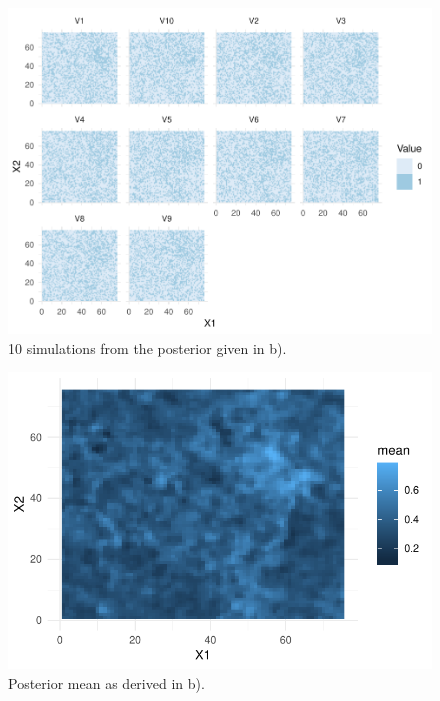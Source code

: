 \begin{figure}
    \centering
    \includegraphics{figures/b_sims.pdf}
    \caption{10 simulations from the posterior given in b).}
    \label{fig:b_sims}
\end{figure}

\begin{figure}
    \centering
    \includegraphics{figures/b_mean.pdf}
    \caption{Posterior mean as derived in b).}
    \label{fig:b_mean}
\end{figure}

